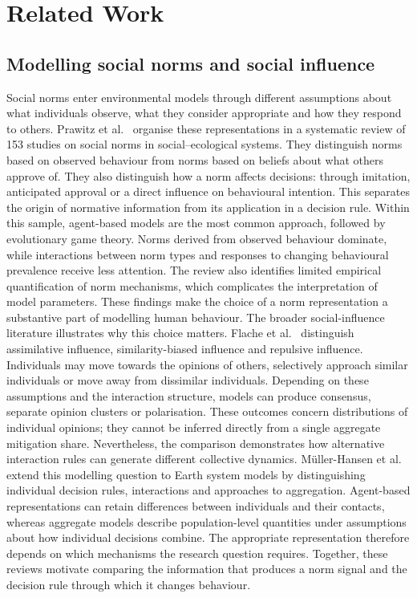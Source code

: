 \chapter{Related Work}
\label{chap:related-work}

\section{Modelling social norms and social influence}
\label{sec:related-norm-modelling}

Social norms enter environmental models through different assumptions about what individuals observe,
what they consider appropriate and how they respond to others. Prawitz et al.~\cite{prawitz2026review}
organise these representations in a systematic review of 153 studies on social norms in
social--ecological systems. They distinguish norms based on observed behaviour from norms based on
beliefs about what others approve of. They also distinguish how a norm affects decisions: through
imitation, anticipated approval or a direct influence on behavioural intention. This separates the origin
of normative information from its application in a decision rule. Within this sample, agent-based models
are the most common approach, followed by evolutionary game theory. Norms derived from observed behaviour
dominate, while interactions between norm types and responses to changing behavioural prevalence receive
less attention. The review also identifies limited empirical quantification of norm mechanisms, which
complicates the interpretation of model parameters. These findings make the choice of a norm
representation a substantive part of modelling human behaviour. The broader social-influence literature
illustrates why this choice matters. Flache et al.~\cite{flache2017influence} distinguish assimilative
influence, similarity-biased influence and repulsive influence. Individuals may move towards the opinions
of others, selectively approach similar individuals or move away from dissimilar individuals. Depending
on these assumptions and the interaction structure, models can produce consensus, separate opinion
clusters or polarisation. These outcomes concern distributions of individual opinions; they cannot be
inferred directly from a single aggregate mitigation share. Nevertheless, the comparison demonstrates how
alternative interaction rules can generate different collective dynamics. M\"uller-Hansen et
al.~\cite{muellerhansen2017behaviour} extend this modelling question to Earth system models by
distinguishing individual decision rules, interactions and approaches to aggregation. Agent-based
representations can retain differences between individuals and their contacts, whereas aggregate models
describe population-level quantities under assumptions about how individual decisions combine. The
appropriate representation therefore depends on which mechanisms the research question requires.
Together, these reviews motivate comparing the information that produces a norm signal and the decision
rule through which it changes behaviour.

